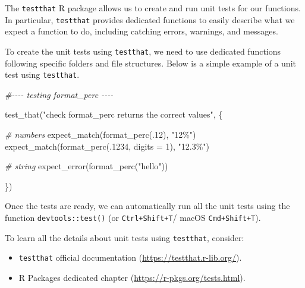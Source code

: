 \documentclass[
  11pt,
]{book}
\newenvironment{Shaded}{\begin{snugshade}}{\end{snugshade}}
\newcommand{\AttributeTok}[1]{\textcolor[rgb]{0.77,0.63,0.00}{#1}}
\newcommand{\CommentTok}[1]{\textcolor[rgb]{0.56,0.35,0.01}{\textit{#1}}}
\newcommand{\DecValTok}[1]{\textcolor[rgb]{0.00,0.00,0.81}{#1}}
\newcommand{\FunctionTok}[1]{\textcolor[rgb]{0.00,0.00,0.00}{#1}}
\newcommand{\NormalTok}[1]{#1}
\newcommand{\StringTok}[1]{\textcolor[rgb]{0.31,0.60,0.02}{#1}}
\providecommand{\tightlist}{%
  \setlength{\itemsep}{0pt}\setlength{\parskip}{0pt}}
\begin{document}
The \texttt{testthat} R package allows us to create and run unit tests for our functions. In particular, \texttt{testthat} provides dedicated functions to easily describe what we expect a function to do, including catching errors, warnings, and messages.

To create the unit tests using \texttt{testthat}, we need to use dedicated functions following specific folders and file structures. Below is a simple example of a unit test using \texttt{testthat}.

\begin{Shaded}
\begin{Highlighting}[]
\CommentTok{\#{-}{-}{-}{-}    testing format\_perc    {-}{-}{-}{-}}

\FunctionTok{test\_that}\NormalTok{(}\StringTok{"check format\_perc returns the correct values"}\NormalTok{, \{}
  
  \CommentTok{\# numbers}
  \FunctionTok{expect\_match}\NormalTok{(}\FunctionTok{format\_perc}\NormalTok{(.}\DecValTok{12}\NormalTok{), }\StringTok{"12\%"}\NormalTok{)}
  \FunctionTok{expect\_match}\NormalTok{(}\FunctionTok{format\_perc}\NormalTok{(.}\DecValTok{1234}\NormalTok{, }\AttributeTok{digits =} \DecValTok{1}\NormalTok{), }\StringTok{"12.3\%"}\NormalTok{)}

  \CommentTok{\# string}
  \FunctionTok{expect\_error}\NormalTok{(}\FunctionTok{format\_perc}\NormalTok{(}\StringTok{"hello"}\NormalTok{))}
  
\NormalTok{\})}
\end{Highlighting}
\end{Shaded}

Once the tests are ready, we can automatically run all the unit tests using the function \texttt{devtools::test()} (or \texttt{Ctrl+Shift+T}/ macOS \texttt{Cmd+Shift+T}).

To learn all the details about unit tests using \texttt{testthat}, consider:

\begin{itemize}
\tightlist
\item
  \texttt{testthat} official documentation (\url{https://testthat.r-lib.org/}).
\item
  R Packages dedicated chapter (\url{https://r-pkgs.org/tests.html}).
\end{itemize}
\end{document}
